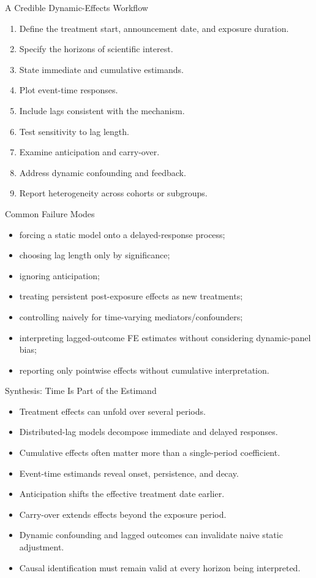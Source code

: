 \documentclass[aspectratio=169,11pt]{beamer}
\begin{document}
\begin{frame}{A Credible Dynamic-Effects Workflow}
\begin{enumerate}
\item Define the treatment start, announcement date, and exposure duration.
\item Specify the horizons of scientific interest.
\item State immediate and cumulative estimands.
\item Plot event-time responses.
\item Include lags consistent with the mechanism.
\item Test sensitivity to lag length.
\item Examine anticipation and carry-over.
\item Address dynamic confounding and feedback.
\item Report heterogeneity across cohorts or subgroups.
\end{enumerate}
\end{frame}

\begin{frame}{Common Failure Modes}
\begin{itemize}
\item forcing a static model onto a delayed-response process;
\item choosing lag length only by significance;
\item ignoring anticipation;
\item treating persistent post-exposure effects as new treatments;
\item controlling naively for time-varying mediators/confounders;
\item interpreting lagged-outcome FE estimates without considering dynamic-panel bias;
\item reporting only pointwise effects without cumulative interpretation.
\end{itemize}
\end{frame}

\begin{frame}{Synthesis: Time Is Part of the Estimand}
\begin{itemize}
\item Treatment effects can unfold over several periods.
\item Distributed-lag models decompose immediate and delayed responses.
\item Cumulative effects often matter more than a single-period coefficient.
\item Event-time estimands reveal onset, persistence, and decay.
\item Anticipation shifts the effective treatment date earlier.
\item Carry-over extends effects beyond the exposure period.
\item Dynamic confounding and lagged outcomes can invalidate naive static adjustment.
\item Causal identification must remain valid at every horizon being interpreted.
\end{itemize}
\end{frame}
\end{document}
